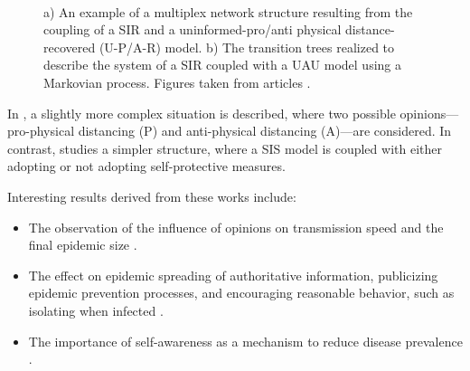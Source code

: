 \begin{figure}[ht]
	\centering
	 \quad
	 \\
	\caption[Multiplex networks]{a) An example of a multiplex network structure resulting from the coupling of a SIR and a uninformed-pro/anti physical distance-recovered (U-P/A-R) model. b) The transition trees realized to describe the system of a SIR coupled  with a UAU model using a Markovian process. Figures taken from articles \cite{Peng2021, Silva2019}.}
	\label{fig:sir_example3}
\end{figure}

In \cite{Peng2021}, a slightly more complex situation is described, where two possible opinions—pro-physical distancing (P) and anti-physical distancing (A)—are considered. In contrast, \cite{Frieswijk_2022} studies a simpler structure, where a SIS model is coupled with either adopting or not adopting self-protective measures.

Interesting results derived from these works include: 
\begin{itemize} 
	\item The observation of the influence of opinions on transmission speed and the final epidemic size \cite{Peng2021}. 
	\item The effect on epidemic spreading of authoritative information, publicizing epidemic prevention processes, and encouraging reasonable behavior, such as isolating when infected \cite{Zuo_2021}. 
	\item The importance of self-awareness as a mechanism to reduce disease prevalence \cite{Silva2019}. 
\end{itemize}

